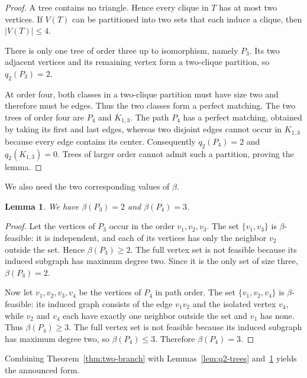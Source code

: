 \documentclass[preprint,12pt]{elsarticle}
\providecommand{\Needspace}[1]{}
\newtheorem{lemma}[theorem]{Lemma}
\numberwithin{equation}{section}
\begin{document}
\begin{proof}
A tree contains no triangle. Hence every clique in \(T\)
has at most two vertices. If \(V(T)\) can be partitioned into two sets
that each induce a clique, then \(|V(T)|\le 4\).

There is only one tree of order three up to isomorphism, namely \(P_3\).
Its two adjacent vertices and its remaining vertex form a two-clique
partition, so \(q_2(P_3)=2\).

At order four, both classes in a two-clique partition must have size two
and therefore must be edges. Thus the two classes form a perfect
matching. The two trees of order four are \(P_4\) and \(K_{1,3}\). The
path \(P_4\) has a perfect matching, obtained by taking its first and
last edges, whereas two disjoint edges cannot occur in \(K_{1,3}\)
because every edge contains its center. Consequently \(q_2(P_4)=2\) and
\(q_2(K_{1,3})=0\). Trees of larger order cannot admit such a partition,
proving the lemma.
\end{proof}

\Needspace{6\baselineskip}
We also need the two corresponding values of \(\beta\).

\begin{lemma}\label{lem:beta-small-paths}
We have \(\beta(P_3)=2\) and \(\beta(P_4)=3\).
\end{lemma}

\begin{proof}
Let the vertices of \(P_3\) occur in the order
\(v_1,v_2,v_3\). The set \(\{v_1,v_3\}\) is \(\beta\)-feasible: it is
independent, and each of its vertices has only the neighbor \(v_2\)
outside the set. Hence \(\beta(P_3)\ge 2\). The full vertex set is not
feasible because its induced subgraph has maximum degree two. Since it
is the only set of size three, \(\beta(P_3)=2\).

Now let \(v_1,v_2,v_3,v_4\) be the vertices of \(P_4\) in path order.
The set \(\{v_1,v_2,v_4\}\) is \(\beta\)-feasible: its induced graph
consists of the edge \(v_1v_2\) and the isolated vertex \(v_4\), while
\(v_2\) and \(v_4\) each have exactly one neighbor outside the set and
\(v_1\) has none. Thus \(\beta(P_4)\ge 3\). The full vertex set is not
feasible because its induced subgraph has maximum degree two, so
\(\beta(P_4)\le 3\). Therefore \(\beta(P_4)=3\).
\end{proof}

Combining Theorem~\ref{thm:two-branch} with Lemmas~\ref{lem:q2-trees}
and~\ref{lem:beta-small-paths} yields the announced form.
\end{document}
